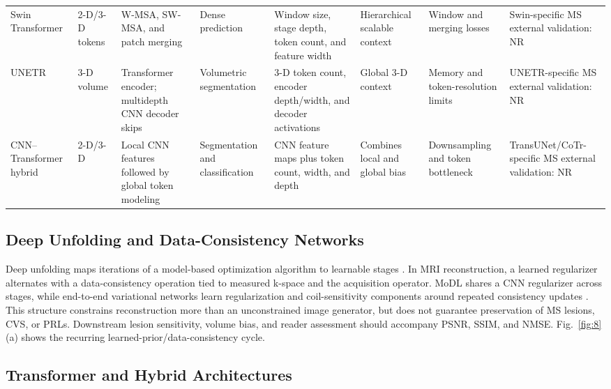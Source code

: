 \documentclass[journal,twoside,web]{ieeecolor}
\begin{document}
\begin{table}[!t]
\begin{tabularx}{\textwidth}{@{}ZZZZZZZZ@{}}
Swin Transformer & 2-D/3-D tokens & W-MSA, SW-MSA, and patch merging & Dense prediction & Window size, stage depth, token count, and feature width & Hierarchical scalable context & Window and merging losses & Swin-specific MS external validation: NR \\
UNETR & 3-D volume & Transformer encoder; multidepth CNN decoder skips & Volumetric segmentation & 3-D token count, encoder depth/width, and decoder activations & Global 3-D context & Memory and token-resolution limits & UNETR-specific MS external validation: NR \\
CNN--Transformer hybrid & 2-D/3-D & Local CNN features followed by global token modeling & Segmentation and classification & CNN feature maps plus token count, width, and depth & Combines local and global bias & Downsampling and token bottleneck & TransUNet/CoTr-specific MS external validation: NR \\
\bottomrule
\end{tabularx}
\end{table}

\subsection{Deep Unfolding and Data-Consistency Networks}\label{subsec:deep-unfolding-and-data-consistency-networks}

Deep unfolding maps iterations of a model-based optimization algorithm to learnable stages \cite{unrolling}. In MRI reconstruction, a learned regularizer alternates with a data-consistency operation tied to measured k-space and the acquisition operator. MoDL shares a CNN regularizer across stages, while end-to-end variational networks learn regularization and coil-sensitivity components around repeated consistency updates \cite{modl,varnet}. This structure constrains reconstruction more than an unconstrained image generator, but does not guarantee preservation of MS lesions, CVS, or PRLs. Downstream lesion sensitivity, volume bias, and reader assessment should accompany PSNR, SSIM, and NMSE. Fig.~\ref{fig:8}(a) shows the recurring learned-prior/data-consistency cycle.


\subsection{Transformer and Hybrid Architectures}\label{subsec:transformer-and-hybrid-architectures}
\end{document}

